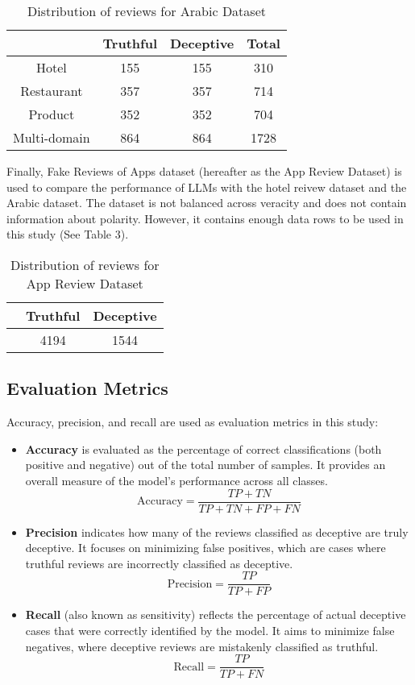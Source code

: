 \documentclass[sigconf, nonacm]{acmart}
\theoremstyle{definition}
\begin{document}
\begin{table}[h!]
  \centering
  \caption{Distribution of reviews for Arabic Dataset}
  \begin{tabular}{c c c c}
    \toprule
                 & Truthful & Deceptive & Total \\
    \midrule
    Hotel        & 155      & 155       & 310   \\
    Restaurant   & 357      & 357       & 714   \\
    Product      & 352      & 352       & 704   \\
    Multi-domain & 864      & 864       & 1728  \\
    \bottomrule
  \end{tabular}
\end{table}

Finally, Fake Reviews of Apps dataset (hereafter as the App Review Dataset) is used to compare the performance of LLMs with the hotel reivew dataset and the Arabic dataset. The dataset is not balanced across veracity and does not contain information about polarity. However, it contains enough data rows to be used in this study (See Table 3).

\begin{table}[h!]
  \centering
  \caption{Distribution of reviews for App Review Dataset}
  \begin{tabular}{c c c}
    \toprule
     & Truthful & Deceptive \\
    \midrule
     & 4194     & 1544      \\
    \bottomrule
  \end{tabular}
\end{table}

\subsection{Evaluation Metrics}
Accuracy, precision, and recall are used as evaluation metrics in this study:

\begin{itemize}
  \item \textbf{Accuracy} is evaluated as the percentage of correct classifications (both positive and negative) out of the total number of samples. It provides an overall measure of the model's performance across all classes.
        \[
          \text{Accuracy} = \frac{TP + TN}{TP + TN + FP + FN}
        \]
  \item \textbf{Precision} indicates how many of the reviews classified as deceptive are truly deceptive. It focuses on minimizing false positives, which are cases where truthful reviews are incorrectly classified as deceptive.
        \[
          \text{Precision} = \frac{TP}{TP + FP}
        \]
  \item \textbf{Recall} (also known as sensitivity) reflects the percentage of actual deceptive cases that were correctly identified by the model. It aims to minimize false negatives, where deceptive reviews are mistakenly classified as truthful.
        \[
          \text{Recall} = \frac{TP}{TP + FN}
        \]
\end{itemize}
\end{document}
